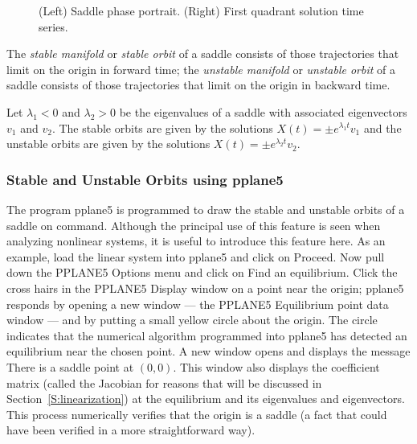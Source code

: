 \documentclass{ximera}
\begin{document}
\begin{figure}[htb]
           \centerline{%
           }
           \caption{(Left) Saddle phase portrait.
	(Right) First quadrant solution time series.}
           \label{F:linsaddle}
\end{figure}

\begin{Def} \label{D:stablemfld}
The {\em stable manifold\/} or {\em stable orbit\/} of a saddle consists of
those trajectories that limit on the origin in forward time; the
{\em unstable manifold\/} or {\em unstable orbit\/} of a saddle consists of
those trajectories that limit on the origin in backward time.
\end{Def}
 
 

Let $\lambda_1<0$ and $\lambda_2>0$ be the eigenvalues of a saddle with
associated eigenvectors $v_1$ and $v_2$.  The stable orbits are given by the
solutions $X(t) = \pm e^{\lambda_1 t}v_1$ and the unstable orbits are given
by the solutions $X(t) = \pm e^{\lambda_2 t}v_2$.

\subsubsection*{Stable and Unstable Orbits using {\sf pplane5}}

The program {\sf pplane5} is programmed to draw the stable and unstable
orbits of a saddle on command. Although the principal use of this
feature is seen when analyzing nonlinear systems, it is useful to
introduce this feature here.  As an example, load the linear system
 into {\sf pplane5} and click on {\sf Proceed}.  Now
pull down the {\sf PPLANE5 Options} menu and click on {\sf Find an
equilibrium}.  Click the cross hairs in the {\sf PPLANE5 Display}
window on a point near the origin; {\sf pplane5} responds by
opening a new window --- the {\sf PPLANE5 Equilibrium point data}
window --- and by putting a small yellow circle about the
origin.  The circle indicates that the numerical algorithm
programmed into {\sf pplane5} has detected an equilibrium near
the chosen point. A new window opens and displays the message
{\sf There is a saddle point at} $(0,0)$.  This window also displays the
coefficient matrix (called the Jacobian for reasons that will be discussed
in Section~\ref{S:linearization}) at the equilibrium and its eigenvalues
and eigenvectors.  This process numerically verifies that the origin
is a saddle (a fact that could have been verified in a more
straightforward way).
\end{document}
